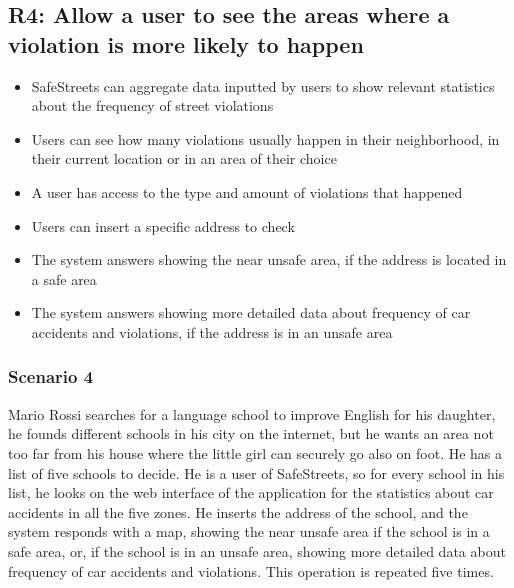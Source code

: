 \subsection{R4: Allow a user to see the areas where a violation is more likely to happen}
\begin{itemize}
    \item SafeStreets can aggregate data inputted by users to show relevant statistics about the frequency of street violations
    \item Users can see how many violations usually happen in their neighborhood, in their current location or in an area of their choice
    \item A user has access to the type and amount of violations that happened
    \item Users can insert a specific address to check
    \item The system answers showing the near unsafe area, if the address is located in a safe area
    \item The system answers showing more detailed data about frequency of car accidents and violations, if the address is in an unsafe area
\end{itemize}
\subsubsection{Scenario 4}
Mario Rossi searches for a language school to improve English for his daughter, he founds different schools in his city on the internet, but he wants an area 
not too far from his house where the little girl can securely go also on foot. He has a list of five schools to decide. He is a user of SafeStreets, so 
for every school in his list, he looks on the web interface of the application for the statistics about car accidents in all the five zones. He inserts the 
address of the school, and the system responds with a map, showing the near unsafe area if the school is in a safe area, or, if the school is in an unsafe 
area, showing more detailed data about frequency of car accidents and violations. This operation is repeated five times.

